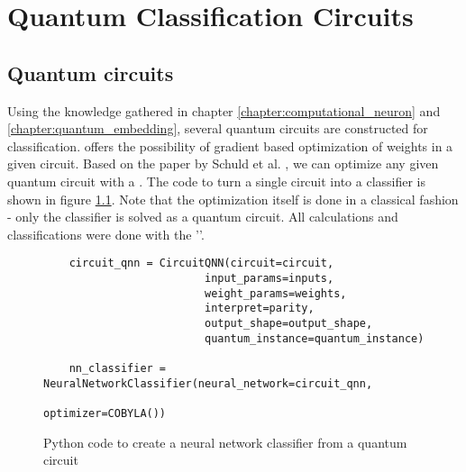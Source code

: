 
\chapter{Quantum Classification Circuits} %

\label{Chapter3}

\section{Quantum circuits}
\label{chapter:quantum_circuits}

Using the knowledge gathered in chapter \ref{chapter:computational_neuron} and \ref{chapter:quantum_embedding}, several quantum circuits are constructed for classification.  offers the possibility of gradient based optimization of weights in a given circuit. Based on the paper by Schuld et al. \cite{schuld_evaluating_2019}, we can optimize any given quantum circuit with a \cite{qiskit_neural_nodate}. The code to turn a single circuit into a classifier is shown in figure \ref{fig:code_qnn}. Note that the optimization itself is done in a classical fashion - only the classifier is solved as a quantum circuit. All calculations and classifications were done with the  ''.

\begin{figure}[!ht]
    \centering
    \begin{verbatim}
    circuit_qnn = CircuitQNN(circuit=circuit,    
                         input_params=inputs,
                         weight_params=weights,
                         interpret=parity,
                         output_shape=output_shape,
                         quantum_instance=quantum_instance)

    nn_classifier = NeuralNetworkClassifier(neural_network=circuit_qnn, 
                                            optimizer=COBYLA())
    \end{verbatim}
    \caption{Python code to create a neural network classifier from a quantum circuit}
    \label{fig:code_qnn}
\end{figure}

